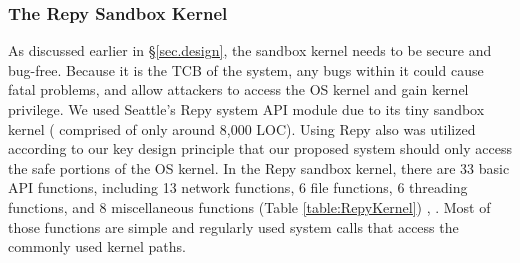 
\subsubsection{The Repy Sandbox Kernel}

As discussed earlier in \S{\ref{sec.design}}, the sandbox kernel needs to be secure and bug-free. 
Because it is the TCB of the system, any bugs within it could cause fatal problems, 
and allow attackers to access the OS kernel and gain kernel privilege. 
We used Seattle's Repy system API module due to its tiny sandbox kernel ( 
comprised of only around 8,000 LOC). Using Repy also was utilized according to our key design principle that 
our proposed system should only access the safe portions of the OS kernel. In the Repy sandbox kernel, 
there are 33 basic API functions, including 13 network functions, 6 file functions, 6 threading functions, 
and 8 miscellaneous functions (Table \ref{table:RepyKernel}) \cite{Repy-10}, \cite{RepyKernel}. Most of those functions are simple and 
regularly used system calls that access the commonly used kernel paths. 

